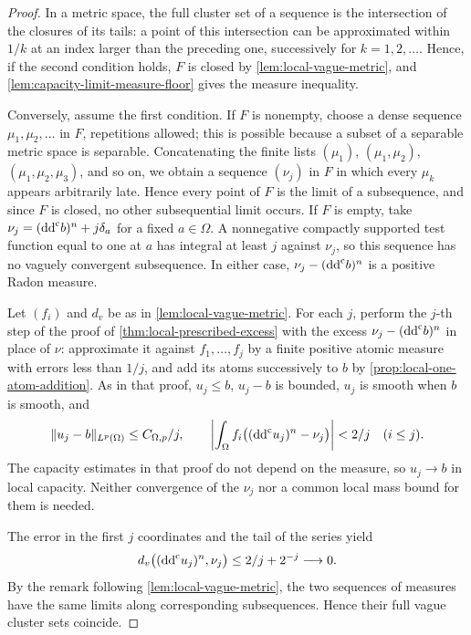 \begin{proof}
In a metric space, the full cluster set of a sequence is the intersection of the closures of its tails: a point of this intersection can be approximated within $1/k$ at an index larger than the preceding one, successively for $k=1,2,\ldots$. Hence, if the second condition holds, $F$ is closed by \cref{lem:local-vague-metric}, and \cref{lem:capacity-limit-measure-floor} gives the measure inequality.

Conversely, assume the first condition. If $F$ is nonempty, choose a dense sequence $\mu_1,\mu_2,\ldots$ in $F$, repetitions allowed; this is possible because a subset of a separable metric space is separable. Concatenating the finite lists $(\mu_1)$, $(\mu_1,\mu_2)$, $(\mu_1,\mu_2,\mu_3)$, and so on, we obtain a sequence $(\nu_j)$ in $F$ in which every $\mu_k$ appears arbitrarily late. Hence every point of $F$ is the limit of a subsequence, and since $F$ is closed, no other subsequential limit occurs. If $F$ is empty, take $\nu_j=(\mathrm{dd}^{\mathrm{c}} b)^n+j\delta_a$ for a fixed $a\in\Omega$. A nonnegative compactly supported test function equal to one at $a$ has integral at least $j$ against $\nu_j$, so this sequence has no vaguely convergent subsequence. In either case, $\nu_j-(\mathrm{dd}^{\mathrm{c}} b)^n$ is a positive Radon measure.

Let $(f_i)$ and $d_v$ be as in \cref{lem:local-vague-metric}. For each $j$, perform the $j$-th step of the proof of \cref{thm:local-prescribed-excess} with the excess $\nu_j-(\mathrm{dd}^{\mathrm{c}} b)^n$ in place of $\nu$: approximate it against $f_1,\ldots,f_j$ by a finite positive atomic measure with errors less than $1/j$, and add its atoms successively to $b$ by \cref{prop:local-one-atom-addition}. As in that proof, $u_j\leq b$, $u_j-b$ is bounded, $u_j$ is smooth when $b$ is smooth, and
\[
 \|u_j-b\|_{L^p(\Omega)}\leq C_{\Omega,p}/j,
 \qquad
 \left|\int_\Omega f_i\bigl((\mathrm{dd}^{\mathrm{c}} u_j)^n-\nu_j\bigr)\right|
       <2/j\quad(i\leq j).
\]
The capacity estimates in that proof do not depend on the measure, so $u_j\to b$ in local capacity. Neither convergence of the $\nu_j$ nor a common local mass bound for them is needed.

The error in the first $j$ coordinates and the tail of the series yield
\[
 d_v\bigl((\mathrm{dd}^{\mathrm{c}} u_j)^n,\nu_j\bigr)\leq 2/j+2^{-j}\longrightarrow0.
\]
By the remark following \cref{lem:local-vague-metric}, the two sequences of measures have the same limits along corresponding subsequences. Hence their full vague cluster sets coincide.
\end{proof}

